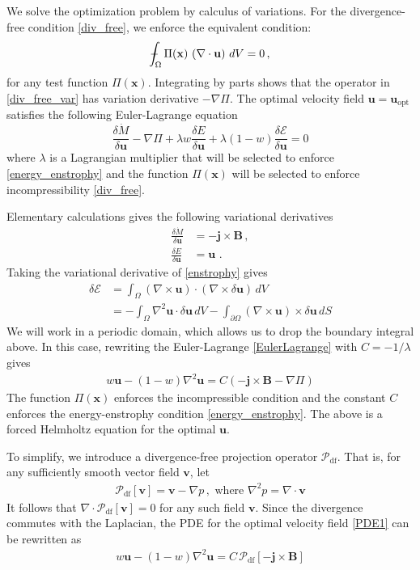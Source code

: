 \documentclass[onecolumn,showpacs,preprintnumbers,amsmath,amssymb]{revtex4-2}
\newcommand{\bvec}[1]{{\mathbf{#1}}}
\newcommand{\grad}{\nabla}
\newcommand{\vd}[2]{\frac{\delta #1 }{\delta #2}}
\newcommand{\uu}{\bvec{u}}
\newcommand{\uopt}{\uu_{\text{opt}}}
\newcommand{\vv}{\bvec{v}}
\newcommand{\xx}{\bvec{x}}
\newcommand{\Bvec}{\bvec{B}}
\newcommand{\jvec}{\bvec{j}}
\newcommand{\weight}{w}
\newcommand{\Lmult}{\lambda}
\newcommand{\proj}{ \mathcal{P}_{\text{df}} }
\def\Xint#1{\mathchoice
   {\XXint\displaystyle\textstyle{#1}}%
   {\XXint\textstyle\scriptstyle{#1}}%
   {\XXint\scriptstyle\scriptscriptstyle{#1}}%
   {\XXint\scriptscriptstyle\scriptscriptstyle{#1}}%
   \!\int}
\def\XXint#1#2#3{{\setbox0=\hbox{$#1{#2#3}{\int}$}
     \vcenter{\hbox{$#2#3$}}\kern-.5\wd0}}
\def\dashint{\Xint-}
\begin{document}
We solve the optimization problem by calculus of variations. 
For the divergence-free condition \cref{div_free}, we enforce the equivalent condition:
\begin{align}
\label{div_free_var}
\dashint_{\Omega} \Pi(\xx) \, \left(\grad \cdot \uu \right) \, dV = 0 \, ,
\end{align}
for any test function $\Pi(\xx)$. Integrating by parts shows that the operator in \cref{div_free_var} has variation derivative $-\grad \Pi$.
The optimal velocity field $\uu = \uopt$ satisfies the following Euler-Lagrange equation
\begin{equation}
\label{EulerLagrange}
\vd{\dot{M}}{\uu} - \grad \Pi + \Lmult \weight \vd{E}{\uu} + \Lmult (1-\weight) \vd{\mathcal{E}}{\uu}  = 0
\end{equation}
where $\Lmult$ is a Lagrangian multiplier that will be selected to enforce \cref{energy_enstrophy} and the function $\Pi(\xx)$ will be selected to enforce incompressibility \cref{div_free}.

Elementary calculations gives the following variational derivatives
\begin{align}
\vd{\dot{M}}{\uu} &= - \jvec \times \Bvec \, , \\
\vd{E}{\uu} &= \uu \, \, .
\end{align}
Taking the variational derivative of \cref{enstrophy} gives
\begin{align}
\delta \mathcal{E} 
&= \int_{\Omega} (\grad \times \uu) \cdot (\grad \times \delta \uu) \, dV \\
&= - \int_{\Omega} \grad^2 \uu \cdot \delta \uu \, dV - \int_{\partial \Omega} \left( \grad \times \uu \right) \times \delta \uu \, dS
\end{align}
We will work in a periodic domain, which allows us to drop the boundary integral above. In this case, rewriting the Euler-Lagrange \cref{EulerLagrange} with $C = -1/\Lmult$ gives
\begin{align}
\label{PDE1}
\weight \uu - (1-\weight) \grad^2 \uu = C \left( - \jvec \times \Bvec - \grad \Pi \right)
\end{align}
The function $\Pi(\xx)$ enforces the incompressible condition and the constant $C$ enforces the energy-enstrophy condition \cref{energy_enstrophy}. The above is a forced Helmholtz equation for the optimal $\uu$.

To simplify, we introduce a divergence-free projection operator $\proj$. That is, for any sufficiently smooth vector field $\vv$, let
\begin{align}
\label{div_free_project}
\proj[ \vv ] = \vv - \grad p \, ,  \text{  where } \grad^2 p = \grad \cdot \vv
\end{align}
It follows that $\grad \cdot \proj[ \vv ] = 0$ for any such field $\vv$.
Since the divergence commutes with the Laplacian,  the PDE for the optimal velocity field \cref{PDE1} can be rewritten as
\begin{align}
\label{PDE2}
\weight \uu - (1-\weight) \grad^2 \uu = C \, \proj \left[ - \jvec \times \Bvec \right]
\end{align}
\end{document}
